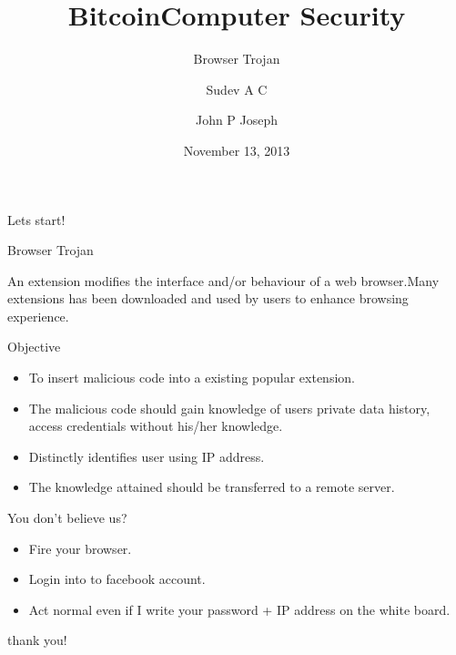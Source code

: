 \documentclass{beamer}
\author{Sudev A C}
\title{Bitcoin}
\institute{NIT Calicut}
\title[Computer Security]{Computer Security}
\subtitle[Browser Trojan]{Browser Trojan}
\author[John P Joseph]{John P Joseph}
\institute[NITC]{
  Department of Computer Science\\
  National Institute of Technology Calicut\\[1ex]
}
\date[November 2013]{November 13, 2013}
\begin{document}
\begin{frame}[plain]
  \titlepage
\end{frame}
\begin{frame}{Lets start!}
\begin{Huge}
Browser Trojan \linebreak \linebreak
\end{Huge}

An extension modifies the interface and/or behaviour of a web browser.Many extensions has been downloaded and used by users to enhance browsing experience.
\end{frame}

\begin{frame}{Objective}
\begin{itemize}
\item To insert malicious code into a existing popular extension.
\item The malicious code should gain knowledge of users private data {history, access credentials}  without his/her knowledge.
\item Distinctly identifies user using IP address.
\item The knowledge attained should be transferred to a remote server.
\end{itemize}

\end{frame}


\begin{frame}{You don't believe us?}
\begin{itemize}
\item Fire your browser.
\item Login into to facebook account.
\item Act normal even if I write your password + IP address on the white board.
\end{itemize}
\end{frame}

\begin{frame}
\begin{center}
\begin{huge}
thank you!
\end{huge}
\end{center}
\end{frame}
\end{document}
